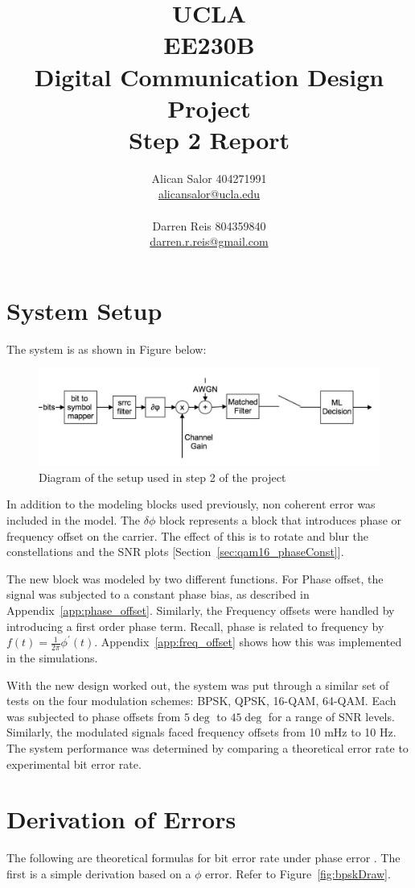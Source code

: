 \documentclass[]{article}
\title{UCLA\\EE230B\\Digital Communication Design Project\\Step 2 Report}
\author{Alican Salor 404271991 \\  \href{mailto:alicansalor@ucla.edu}{alicansalor@ucla.edu} \\ \\
Darren Reis 804359840 \\
\href{mailto:darrer.r.reis@gmail.com}{darren.r.reis@gmail.com} }
\begin{document}
\maketitle

\newpage
\tableofcontents

\newpage


\section{System Setup}
\label{sec:setup}
The system is as shown in Figure below:

\begin{figure}[H]
\centering
\includegraphics[width=\textwidth]{step2.jpg}
\caption{Diagram of the setup used in step 2 of the project}
\end{figure}

In addition to the modeling blocks used previously, non coherent error was included in the model.  The $\delta\phi$ block represents a block that introduces phase or frequency offset on the carrier.  The effect of this is to rotate and blur the constellations and the SNR plots [Section~\ref{sec:qam16_phaseConst}].

The new block was modeled by two different functions.  For Phase offset, the signal was subjected to a constant phase bias, as described in Appendix~\ref{app:phase_offset}.  Similarly, the Frequency offsets were handled by introducing a first order phase term.  Recall, phase is related to frequency by $f(t) = \frac{1}{2 \pi} \phi^\prime(t)$.  Appendix~\ref{app:freq_offset} shows how this was implemented in the simulations.

With the new design worked out, the system was put through a similar set of tests on the four modulation schemes: BPSK, QPSK, 16-QAM, 64-QAM.  Each was subjected to phase offsets from $5\deg$ to $45\deg$ for a range of SNR levels.  Similarly, the modulated signals faced frequency offsets from 10 mHz to 10 Hz.  The system performance was determined by comparing a theoretical error rate to experimental bit error rate.  
\section{Derivation of Errors}
\label{sec:errors}
The following are theoretical formulas for bit error rate under phase error \cite{howald}.  The first is a simple derivation based on a $\phi$ error.  Refer to Figure~\ref{fig:bpskDraw}.
\end{document}
